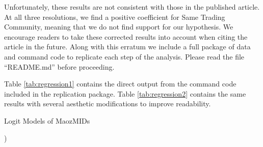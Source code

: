 \documentclass[11pt,fleqn]{article}
\begin{document}
Unfortunately, these results are not consistent with those in the published article.  At all three resolutions, we find a positive coefficient for {\sc Same Trading Community}, meaning that we do not find support for our hypothesis.  We encourage readers to take these corrected results into account when citing the article in the future.  Along with this erratum we include a full package of data and command code to replicate each step of the analysis.  Please read the file ``README.md'' before proceeding.
 
Table \ref{tab:regression1} contains the direct output from the command code included in the replication package.  Table \ref{tab:regression2} contains the same results with several aesthetic modifications to improve readability.

\begin{table}[!h]
\tiny
\begin{center}
\begin{singlespace}
  \caption{Logit Models of {\sc MaozMIDs}}
  \label{tab:regression1}
)
\end{singlespace}
\end{center}
\end{table}
\end{document}
